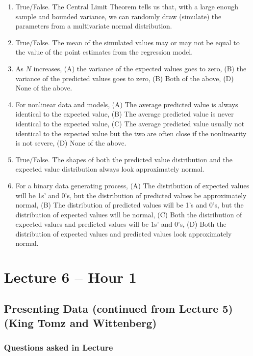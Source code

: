 \documentclass[11pt]{article}
\begin{document}
\begin{enumerate}
\item True/False. The Central Limit Theorem tells us that, with a large enough sample and bounded variance, we can randomly draw (simulate) the parameters from a multivariate normal distribution. 
\item True/False. The mean of the simulated values may or may not be equal to the value of the point estimates from the regression model. 
\item As $N$ increases, (A) the variance of the expected values goes to zero, (B) the variance of the predicted values goes to zero, (B) Both of the above, (D) None of the above. 
\item For nonlinear data and models, (A) The average predicted value is always identical to the expected value, (B) The average predicted value is never identical to the expected value, (C) The average predicted value usually not identical to the expected value but the two are often close if the nonlinearity is not severe, (D) None of the above. 
\item True/False.  The shapes of both the predicted value distribution and the expected value distribution always look approximately normal.
\item For a binary data generating process, (A) The distribution of expected values will be 1s' and 0's, but the distribution of predicted values be approximately normal, (B) The distribution of predicted values will be 1's and 0's, but the distribution of expected values will be normal, (C) Both the distribution of expected values and predicted values will be 1s' and 0's, (D) Both the distribution of expected values and predicted values look approximately normal.
\end{enumerate}


\section{Lecture 6 -- Hour 1}

\subsection{Presenting Data (continued from Lecture 5) (King Tomz and Wittenberg)}

\subsubsection{Questions asked in Lecture}
\end{document}

